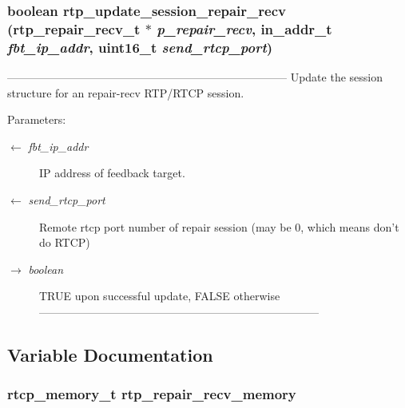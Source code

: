 \subsubsection{\setlength{\rightskip}{0pt plus 5cm}boolean rtp\_\-update\_\-session\_\-repair\_\-recv (\bf{rtp\_\-repair\_\-recv\_\-t} $\ast$ {\em p\_\-repair\_\-recv}, in\_\-addr\_\-t {\em fbt\_\-ip\_\-addr}, uint16\_\-t {\em send\_\-rtcp\_\-port})}\label{rtp__repair__recv_8c_40c0c2567996ea54f866f61490a7ac05}


--------------------------------------------------------------------------- Update the session structure for an repair-recv RTP/RTCP session.

\begin{Desc}
\item[Parameters:]
\begin{description}
\item[\mbox{$\leftarrow$} {\em fbt\_\-ip\_\-addr}]IP address of feedback target. \item[\mbox{$\leftarrow$} {\em send\_\-rtcp\_\-port}]Remote rtcp port number of repair session (may be 0, which means don't do RTCP) \item[\mbox{$\rightarrow$} {\em boolean}]TRUE upon successful update, FALSE otherwise --------------------------------------------------------------------------- \end{description}
\end{Desc}


\subsection{Variable Documentation}
\subsubsection{\setlength{\rightskip}{0pt plus 5cm}rtcp\_\-memory\_\-t \bf{rtp\_\-repair\_\-recv\_\-memory}\hspace{0.3cm}{\tt  [static]}}\label{rtp__repair__recv_8c_928c5a63309e0cf6ca0ea3e574891cf7}


